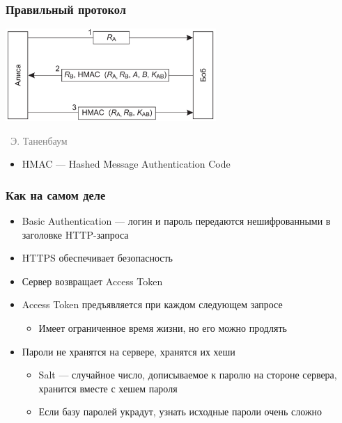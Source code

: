 \documentclass[xetex,mathserif,serif]{beamer}
\newcommand{\attribution}[1] {
\vspace{-5mm}\begin{flushright}\begin{scriptsize}\textcolor{gray}{\textcopyright\, #1}\end{scriptsize}\end{flushright}
}
\begin{document}
    \begin{frame}
        \frametitle{Правильный протокол}
        \begin{center}
            \includegraphics[width=0.6\textwidth]{hmacs.png}
            \attribution{Э. Таненбаум}
        \end{center}
        \begin{itemize}
            \item HMAC --- Hashed Message Authentication Code
        \end{itemize}
    \end{frame}

    \begin{frame}
        \frametitle{Как на самом деле}
        \begin{itemize}
            \item Basic Authentication --- логин и пароль передаются нешифрованными в заголовке HTTP-запроса
            \item HTTPS обеспечивает безопасность
            \item Сервер возвращает Access Token
            \item Access Token предъявляется при каждом следующем запросе
            \begin{itemize}
                \item Имеет ограниченное время жизни, но его можно продлять
            \end{itemize}
            \item Пароли не хранятся на сервере, хранятся их хеши
            \begin{itemize}
                \item Salt --- случайное число, дописываемое к паролю на стороне сервера, хранится вместе с хешем пароля
                \item Если базу паролей украдут, узнать исходные пароли очень сложно
            \end{itemize}
        \end{itemize}
    \end{frame}
\end{document}
